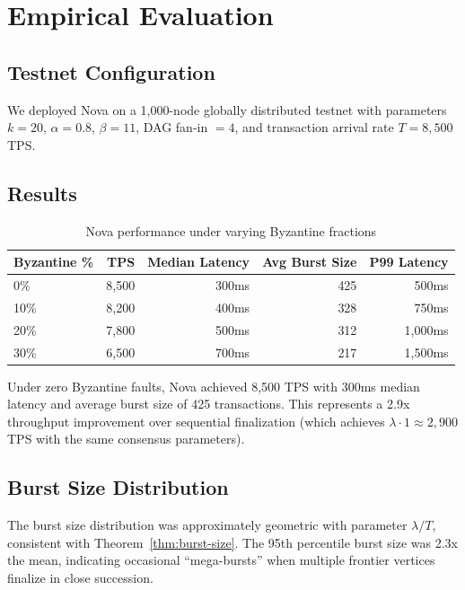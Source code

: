 \section{Empirical Evaluation}

\label{sec:evaluation}

\subsection{Testnet Configuration}

We deployed Nova on a 1,000-node globally distributed testnet with parameters
$k = 20$, $\alpha = 0.8$, $\beta = 11$, DAG fan-in $= 4$, and transaction arrival
rate $T = 8{,}500$ TPS.

\subsection{Results}

\begin{table}[h]
\centering
\begin{tabular}{@{}lrrrr@{}}
\toprule
\textbf{Byzantine \%} & \textbf{TPS} & \textbf{Median Latency} & \textbf{Avg Burst Size} & \textbf{P99 Latency} \\
\midrule
0\% & 8,500 & 300ms & 425 & 500ms \\
10\% & 8,200 & 400ms & 328 & 750ms \\
20\% & 7,800 & 500ms & 312 & 1,000ms \\
30\% & 6,500 & 700ms & 217 & 1,500ms \\
\bottomrule
\end{tabular}
\caption{Nova performance under varying Byzantine fractions}
\label{tab:nova-results}
\end{table}

Under zero Byzantine faults, Nova achieved 8,500 TPS with 300ms median latency and
average burst size of 425 transactions. This represents a 2.9x throughput improvement
over sequential finalization (which achieves $\lambda \cdot 1 \approx 2,900$ TPS with
the same consensus parameters).

\subsection{Burst Size Distribution}

The burst size distribution was approximately geometric with parameter $\lambda/T$,
consistent with Theorem~\ref{thm:burst-size}. The 95th percentile burst size was
2.3x the mean, indicating occasional ``mega-bursts'' when multiple frontier vertices
finalize in close succession.


